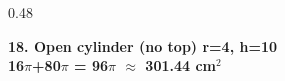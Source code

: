 \documentclass[aspectratio=169,12pt]{beamer}
\begin{document}
\begin{frame}[t]
\begin{columns}[T,onlytextwidth]
\begin{column}{0.48\textwidth}\begin{AnsCard}\small\textcolor{mmgreenDeep}{\textbf{18. Open cylinder (no top) r=4, h=10}}\\\vspace{0.1em}\textcolor{mmanswerColor}{\textbf{16$\pi$+80$\pi$ = 96$\pi$ $\approx$ 301.44 cm$^2$}}\end{AnsCard}\end{column}
\end{columns}
\end{frame}
\end{document}
